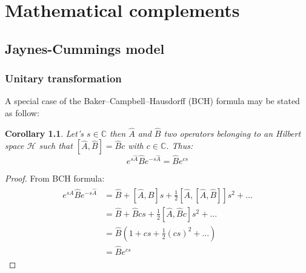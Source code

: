 \documentclass[10pt]{report}
\newtheorem{corollary}{Corollary}[theorem]
\begin{document}
\appendix
\chapter{Mathematical complements}
\section{Jaynes-Cummings model}
\subsection{Unitary transformation}
A special case of the Baker–Campbell–Hausdorff (BCH) formula may be stated as follow:

\begin{corollary}
Let's $s \in \mathbb{C}$ then $\hat{A}$ and $\hat{B}$ two operators belonging to an Hilbert space $\mathscr{H}$ such that $\left[ \hat{A}, \hat{B} \right] = \hat{B}c$ with $c \in \mathbb{C}$. Thus: 
\begin{equation}
e^{s\hat{A}}\hat{B}e^{-s\hat{A}} = \hat{B}e^{cs}
\end{equation}
\end{corollary}
\begin{proof}
From BCH formula:
\begin{align}
\begin{split}
e^{s\hat{A}}\hat{B}e^{-s\hat{A}} &= \hat{B} + \left[ \hat{A}, \hat{B} \right]s + \frac{1}{2} \left[ \hat{A}, \left[ \hat{A}, \hat{B} \right] \right] s^2 + ... \\
&= \hat{B} + \hat{B}cs + \frac{1}{2} \left[ \hat{A}, \hat{B}c \right] s^2 + ...\\
&= \hat{B}(1 + cs + \frac{1}{2}(cs)^2 + ...)\\
&= \hat{B}e^{cs}
\end{split}
\end{align}
\end{proof}
\end{document}
